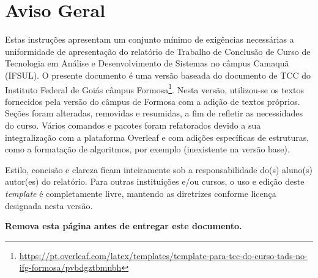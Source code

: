 \chapter*[Aviso Geral]{Aviso Geral}


Estas instruções apresentam um conjunto mínimo de exigências necessárias a 
uniformidade de apresentação do relatório de Trabalho de Conclusão de Curso de Tecnologia em Análise e Desenvolvimento de Sistemas no câmpus Camaquã (IFSUL). O presente documento é uma versão baseada do documento de TCC do Instituto Federal de Goiás câmpus Formosa\footnote{\url{https://pt.overleaf.com/latex/templates/template-para-tcc-do-curso-tads-no-ifg-formosa/pvbdgztbmnbh}}. Nesta versão, utilizou-se os textos fornecidos pela versão do câmpus de Formosa com a adição de textos próprios. Seções foram alteradas, removidas e resumidas, a fim de refletir as necessidades do curso. Vários comandos e pacotes foram refatorados devido a sua integralização com a plataforma Overleaf e com adições específicas de estruturas, como a formatação de algoritmos, por exemplo (inexistente na versão base).

Estilo, concisão e clareza ficam inteiramente sob a responsabilidade do(s) aluno(s) autor(es) do relatório. Para outras instituições e/ou cursos, o uso e edição deste \textit{template} é completamente livre, mantendo as diretrizes conforme licença designada nesta versão.


\textbf{Remova esta página antes de entregar este documento.}

